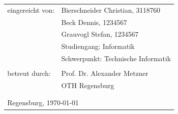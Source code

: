 \hskip 2.0cm
\begin{small}
\begin{tabular}{ll}
eingereicht von:\hspace{0.7cm} & Bierschneider Christian, 3118760 \tabularnewline
 & Beck Dennis, \hspace{1.75cm} 1234567 \tabularnewline
 & Grauvogl Stefan, \hspace{1.15cm} 1234567 \tabularnewline
 & Studiengang: Informatik\tabularnewline
 & Schwerpunkt: Technische Informatik \tabularnewline
 & \tabularnewline
 
 
betreut durch: & Prof. Dr. Alexander Metzner\tabularnewline
 & OTH Regensburg\tabularnewline
 & \tabularnewline
  & \tabularnewline
\multicolumn{2}{l}{Regensburg, \today}\tabularnewline
\end{tabular}
\end{small}